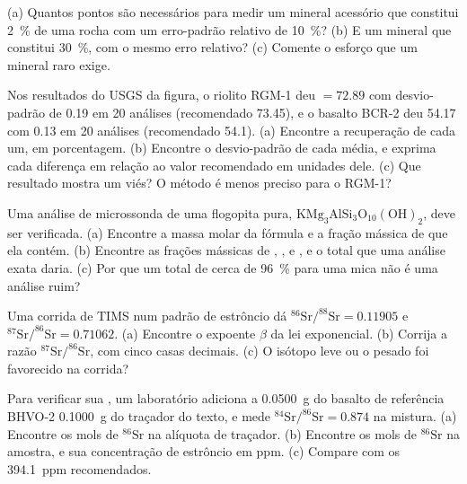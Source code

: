 \begin{exercise}[$\star\star$]\label{exo:b2:field-lab-methods-2:5}
(a) Quantos pontos são necessários para medir um mineral acessório que constitui \qty{2}{\percent} de uma rocha
com um erro-padrão relativo de \qty{10}{\percent}? (b) E um mineral que constitui \qty{30}{\percent},
com o mesmo erro relativo? (c) Comente o esforço que um mineral raro exige.
\end{exercise}

\begin{exercise}[$\star\star$]\label{exo:b2:field-lab-methods-2:6}
Nos resultados do USGS da figura, o riolito RGM-1 deu  $= 72.89$ com desvio-padrão
de 0.19 em 20 análises (recomendado 73.45), e o basalto BCR-2 deu 54.17 com 0.13 em
20 análises (recomendado 54.1). (a) Encontre a recuperação de cada um, em porcentagem. (b) Encontre o desvio-padrão
de cada média, e exprima cada diferença em relação ao valor recomendado em unidades dele.
(c) Que resultado mostra um viés? O método é menos preciso para o RGM-1?
\end{exercise}

\begin{exercise}[$\star\star$]\label{exo:b2:field-lab-methods-2:7}
Uma análise de microssonda de uma flogopita pura, $\mathrm{KMg_3AlSi_3O_{10}(OH)_2}$, deve ser verificada.
(a) Encontre a massa molar da fórmula e a fração mássica de  que ela contém. (b) Encontre as
frações mássicas de , ,  e , e o total que uma análise exata
daria. (c) Por que um total de cerca de \qty{96}{\percent} para uma mica não é uma análise ruim?
\end{exercise}

\begin{exercise}[$\star\star$]\label{exo:b2:field-lab-methods-2:8}
Uma corrida de TIMS num padrão de estrôncio dá $^{86}\mathrm{Sr}/^{88}\mathrm{Sr} = 0.11905$ e
$^{87}\mathrm{Sr}/^{86}\mathrm{Sr} = 0.71062$. (a) Encontre o expoente $\beta$ da lei exponencial.
(b) Corrija a razão $^{87}\mathrm{Sr}/^{86}\mathrm{Sr}$, com cinco casas decimais. (c) O isótopo leve ou
o pesado foi favorecido na corrida?
\end{exercise}

\begin{exercise}[$\star\star$]\label{exo:b2:field-lab-methods-2:9}
Para verificar sua , um laboratório adiciona a \qty{0.0500}{g} do basalto de referência BHVO-2
\qty{0.1000}{g} do traçador do texto, e mede $^{84}\mathrm{Sr}/^{86}\mathrm{Sr} =
0.874$ na mistura. (a) Encontre os mols de $^{86}\mathrm{Sr}$ na alíquota de traçador. (b) Encontre os
mols de $^{86}\mathrm{Sr}$ na amostra, e sua concentração de estrôncio em ppm. (c) Compare com
os \qty{394.1}{ppm} recomendados.
\end{exercise}

